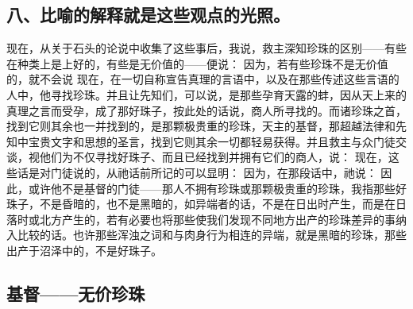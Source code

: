 
\subsection{八、比喻的解释就是这些观点的光照。}

现在，从关于石头的论说中收集了这些事后，我说，救主深知珍珠的区别——有些在种类上是上好的，有些是无价值的——便说：  因为，若有些珍珠不是无价值的，就不会说  现在，在一切自称宣告真理的言语中，以及在那些传述这些言语的人中，他寻找珍珠。并且让先知们，可以说，是那些孕育天露的蚌，因从天上来的真理之言而受孕，成了那好珠子，按此处的话说，商人所寻找的。而诸珍珠之首，找到它则其余也一并找到的，是那颗极贵重的珍珠，天主的基督，那超越法律和先知中宝贵文字和思想的圣言，找到它则其余一切都轻易获得。并且救主与众门徒交谈，视他们为不仅寻找好珠子、而且已经找到并拥有它们的商人，说：  现在，这些话是对门徒说的，从祂话前所记的可以显明：  因为，在那段话中，祂说：  因此，或许他不是基督的门徒——那人不拥有珍珠或那颗极贵重的珍珠，我指那些好珠子，不是昏暗的，也不是黑暗的，如异端者的话，不是在日出时产生，而是在日落时或北方产生的，若有必要也将那些使我们发现不同地方出产的珍珠差异的事纳入比较的话。也许那些浑浊之词和与肉身行为相连的异端，就是黑暗的珍珠，那些出产于沼泽中的，不是好珠子。\par


\subsection{基督——无价珍珠}


